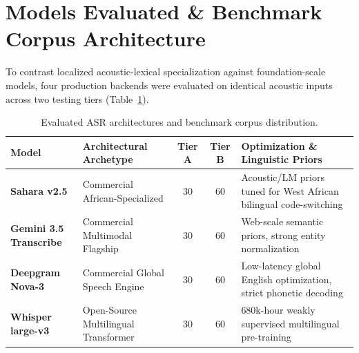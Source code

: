 \documentclass[9pt,a4paper]{extarticle}
\begin{document}
\section{Models Evaluated \& Benchmark Corpus Architecture}
To contrast localized acoustic-lexical specialization against foundation-scale models, four production backends were evaluated on identical acoustic inputs across two testing tiers (Table~\ref{tab:models}).

\begin{table}[H]
\centering
\caption{Evaluated ASR architectures and benchmark corpus distribution.}
\label{tab:models}
\fontsize{7.2}{8.5}\selectfont
\begin{tabularx}{\linewidth}{l X c c l}
\toprule
\textbf{Model} & \textbf{Architectural Archetype} & \textbf{Tier A} & \textbf{Tier B} & \textbf{Optimization \& Linguistic Priors} \\
\midrule
\textbf{Sahara v2.5} & Commercial African-Specialized & 30 & 60 & Acoustic/LM priors tuned for West African bilingual code-switching \\
\textbf{Gemini 3.5 Transcribe} & Commercial Multimodal Flagship & 30 & 60 & Web-scale semantic priors, strong entity normalization \\
\textbf{Deepgram Nova-3} & Commercial Global Speech Engine & 30 & 60 & Low-latency global English optimization, strict phonetic decoding \\
\textbf{Whisper large-v3} & Open-Source Multilingual Transformer & 30 & 60 & 680k-hour weakly supervised multilingual pre-training \\
\bottomrule
\end{tabularx}
\end{table}
\vspace{-4pt}
\end{document}
